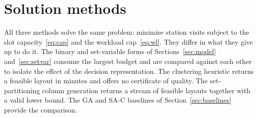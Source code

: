 \documentclass[]{interact}
\begin{document}
\section{Solution methods}\label{sec:methods}
All three methods solve the same problem: minimise station visits subject to the slot capacity~\eqref{eq:cap} and the workload cap~\eqref{eq:wl}. They differ in what they give up to do it. The binary and set-variable forms of Sections~\ref{sec:model} and~\ref{sec:setvar} consume the largest budget and are compared against each other to isolate the effect of the decision representation. The clustering heuristic returns a feasible layout in minutes and offers no certificate of quality. The set-partitioning column generation returns a stream of feasible layouts together with a valid lower bound. The GA and SA-C baselines of Section~\ref{sec:baselines} provide the comparison.
\end{document}
